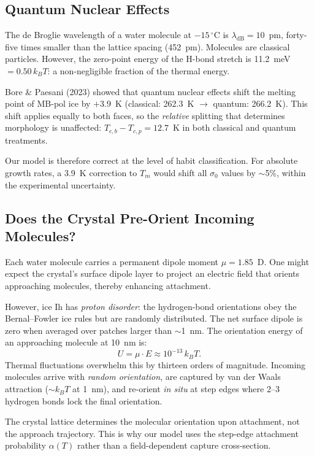 \documentclass[12pt,letterpaper]{article}
\begin{document}
\subsection{Quantum Nuclear Effects}

The de Broglie wavelength of a water molecule at $-15\,{}^\circ$C is $\lambda_{\mathrm{dB}} = 10$~pm, forty-five times smaller than the lattice spacing (452~pm).  Molecules are classical particles.  However, the zero-point energy of the H-bond stretch is 11.2~meV $= 0.50\,k_BT$: a non-negligible fraction of the thermal energy.

Bore \& Paesani (2023) showed that quantum nuclear effects shift the melting point of MB-pol ice by $+3.9$~K (classical: 262.3~K $\to$ quantum: 266.2~K).  This shift applies equally to both faces, so the \emph{relative} splitting that determines morphology is unaffected: $T_{c,b} - T_{c,p} = 12.7$~K in both classical and quantum treatments.

Our model is therefore correct at the level of habit classification.  For absolute growth rates, a 3.9~K correction to $T_m$ would shift all $\sigma_0$ values by $\sim$5\%, within the experimental uncertainty.

\subsection{Does the Crystal Pre-Orient Incoming Molecules?}

Each water molecule carries a permanent dipole moment $\mu = 1.85$~D.  One might expect the crystal's surface dipole layer to project an electric field that orients approaching molecules, thereby enhancing attachment.

However, ice Ih has \emph{proton disorder}: the hydrogen-bond orientations obey the Bernal--Fowler ice rules but are randomly distributed.  The net surface dipole is zero when averaged over patches larger than $\sim$1~nm.  The orientation energy of an approaching molecule at 10~nm is:
\[
U = \mu \cdot E \approx 10^{-13}\,k_BT.
\]
Thermal fluctuations overwhelm this by thirteen orders of magnitude.  Incoming molecules arrive with \emph{random orientation}, are captured by van der Waals attraction ($\sim k_BT$ at 1~nm), and re-orient \emph{in situ} at step edges where 2--3 hydrogen bonds lock the final orientation.

The crystal lattice determines the molecular orientation upon attachment, not the approach trajectory.  This is why our model uses the step-edge attachment probability $\alpha(T)$ rather than a field-dependent capture cross-section.
\end{document}
